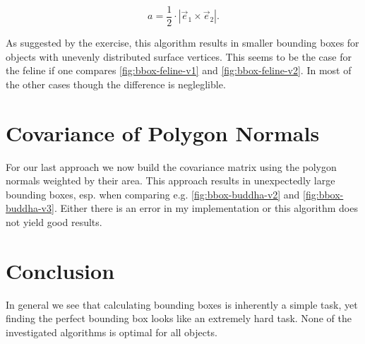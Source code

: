 \documentclass[a4paper,10pt,notitlepage]{scrreprt}
\begin{document}
\begin{equation}
 a = \frac{1}{2} \cdot |\vec{e}_1 \times \vec{e}_2|.
\end{equation}

As suggested by the exercise, this algorithm results in smaller bounding boxes
for objects with unevenly distributed surface vertices. This seems to be the
case for the feline if one compares \ref{fig:bbox-feline-v1} and
\ref{fig:bbox-feline-v2}. In most of the other cases though the difference is
negleglible.

\section{Covariance of Polygon Normals}

For our last approach we now build the covariance matrix using the polygon
normals weighted by their area. This approach results in unexpectedly large
bounding boxes, esp. when comparing e.g. \ref{fig:bbox-buddha-v2} and
\ref{fig:bbox-buddha-v3}. Either there is an error in my implementation or this
algorithm does not yield good results.

\section{Conclusion}

In general we see that calculating bounding boxes is inherently a simple task,
yet finding the perfect bounding box looks like an extremely hard task. None of
the investigated algorithms is optimal for all objects.
\end{document}

